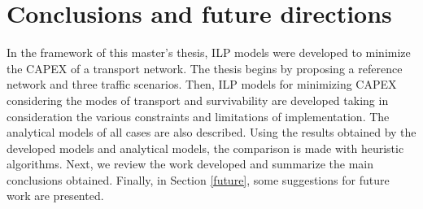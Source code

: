 
\chapter{Conclusions and future directions}
\label{chap_conclusions}

In the framework of this master's thesis, ILP models were developed to minimize the CAPEX of a transport network. The thesis begins by proposing a reference network and three traffic scenarios. Then, ILP models for minimizing CAPEX considering the modes of transport and survivability are developed taking in consideration the various constraints and limitations of implementation. The analytical models of all cases are also described. Using the results obtained by the developed models and analytical models, the comparison is made with heuristic algorithms. Next, we review the work developed and summarize the main conclusions obtained. Finally, in Section \ref{future}, some suggestions for future work are presented.




